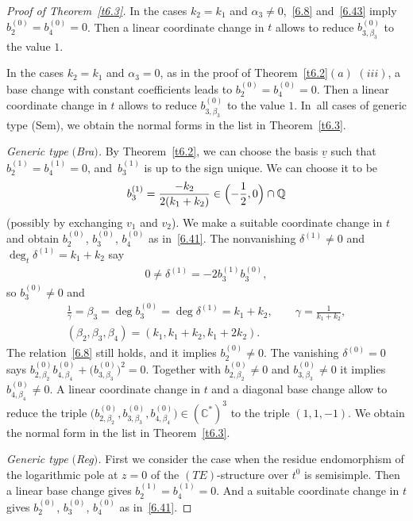 \documentclass[10pt,a4paper]{amsart}
\numberwithin{equation}{section}
\numberwithin{figure}{section}
\newcommand{\Q}{{\mathbb Q}}
\newcommand{\C}{{\mathbb C}}
\newcommand{\uuuu}{\underline}
\begin{document}
\begin{proof}[Proof of Theorem~\ref{t6.3}]
In the cases $k_2=k_1$ and $\alpha_3\neq 0$,~\eqref{6.8}
and~\eqref{6.43} imply $b_2^{(0)}=b_4^{(0)}=0$.
Then a linear coordinate change in $t$ allows to reduce
$b_{3,\beta_3}^{(0)}$ to the value $1$.

In the cases $k_2=k_1$ and $\alpha_3=0$,
as in the proof of Theorem~\ref{t6.2}$(a)$ $(iii)$,
a base change with constant coefficients leads to
$b_2^{(0)}=b_4^{(0)}=0$. Then a linear coordinate change
in $t$ allows to reduce $b_{3,\beta_3}^{(0)}$ to the value
$1$. In~all cases of generic type (Sem), we obtain the
normal forms in the list in Theorem~\ref{t6.3}.

\medskip\noindent
{\it Generic type $($Bra$)$.}
By Theorem~\ref{t6.2}, we can choose the basis $\uuuu{v}$
such that $b_2^{(1)}=b_4^{(1)}=0$,
and~$b_3^{(1)}$ is up to the sign unique.
We can choose it to be
\begin{gather*}
b_3^{(1)}=\frac{-k_2}{2(k_1+k_2)}\in
\Bigl(-\frac{1}{2},0\Bigr)\cap\Q
\end{gather*}
(possibly by exchanging $v_1$ and $v_2$).
We make a suitable coordinate change in $t$ and obtain
$b_2^{(0)}$, $b_3^{(0)}$, $b_4^{(0)}$ as in~\eqref{6.41}.
The nonvanishing $\delta^{(1)}\neq 0$
and $\deg_t\delta^{(1)}=k_1+k_2$ say
\begin{gather*}
0\neq \delta^{(1)}=-2b_3^{(1)}b_3^{(0)},
\end{gather*}
so $b_3^{(0)}\neq 0$ and
\begin{gather*}%
\frac1\gamma=\beta_3=\deg b_3^{(0)}=\deg\delta^{(1)}=k_1+k_2,\qquad
\gamma=\frac{1}{k_1+k_2},
\\
(\beta_2,\beta_3,\beta_4)=(k_1,k_1+k_2,k_1+2k_2).%
\end{gather*}
The relation~\eqref{6.8} still holds, and it implies
$b_2^{(0)}\neq 0$. The vanishing $\delta^{(0)}=0$ says
$b_{2,\beta_2}^{(0)}b_{4,\beta_4}^{(0)}+\big(b_{3,\beta_3}^{(0)}\big)^2
= 0$. Together with $b_{2,\beta_2}^{(0)}\neq 0$ and
$b_{3,\beta_3}^{(0)}\neq 0$ it implies
$b_{4,\beta_4}^{(0)}\neq 0$.
A linear coordinate change in $t$
and a diagonal base change allow to reduce the triple
$\big(b_{2,\beta_2}^{(0)},b_{3,\beta_3}^{(0)},b_{4,\beta_4}^{(0)}\big)
\in(\C^*)^3$ to the triple $(1,1,-1)$. We obtain the
normal form in the list in Theorem~\ref{t6.3}.

\medskip\noindent
{\it Generic type $($Reg$)$.}
First we consider the case when the residue endomorphism
of the logarithmic pole at $z=0$ of the $(TE)$-structure
over $t^0$ is semisimple. Then a linear base change
gives $b_2^{(1)}=b_4^{(1)}=0$. And a suitable coordinate
change in $t$ gives $b_2^{(0)}$, $b_3^{(0)}$, $b_4^{(0)}$
as in~\eqref{6.41}.


\end{proof}
\end{document}
